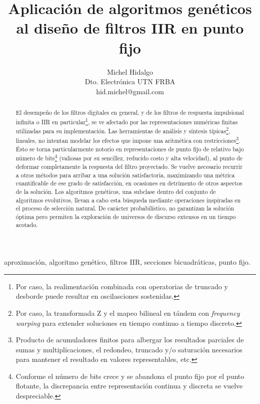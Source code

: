 \documentclass[11pt, journal]{IEEEtran}
\title{Aplicación de algoritmos genéticos al diseño de filtros IIR en punto fijo}
\author{Michel Hidalgo\\Dto. Electrónica UTN FRBA\\hid.michel@gmail.com}
\begin{document}
\maketitle

\begin{abstract}

  El desempeño de los filtros digitales en general, y de los filtros de
  respuesta impulsional infinita o IIR en particular\footnote{Por caso, la realimentación
    combinada con operatorias de truncado y desborde puede resultar en oscilasciones sostenidas.},
  se ve afectado por las representaciones numéricas finitas utilizadas para su implementación.
  Las herramientas de análisis y síntesis típicas\footnote{Por caso, la transformada Z y el
    mapeo bilineal en tándem con \emph{frequency warping} para extender soluciones en tiempo
    continuo a tiempo discreto.}, lineales, no intentan modelar los efectos que impone una
  aritmética con restricciones\footnote{Producto de acumuladores finitos para albergar los
    resultados parciales de sumas y multiplicaciones, el redondeo, truncado y/o saturación
    necesarios para mantener el resultado en valores representables, etc.}. Ésto se torna
  particularmente notorio en representaciones de punto fijo de relativo bajo número de
  bits\footnote{Conforme el número de bits crece y se abandona el punto fijo por el
    punto flotante, la discrepancia entre representación continua y discreta se vuelve
    despreciable.} (valiosas por su sencillez, reducido costo y alta velocidad), al punto de
  deformar completamente la respuesta del filtro proyectado. Se vuelve necesario recurrir a
  otros métodos para arribar a una solución satisfactoria, maximizando una métrica cuantificable
  de ese grado de satisfacción, en ocasiones en detrimento de otros aspectos de la solución.
  Los algoritmos genéticos, una subclase dentro del conjunto de algoritmos evolutivos, llevan a
  cabo esta búsqueda mediante operaciones inspiradas en el proceso de selección natural.
  De carácter probabilístico, no garantizan la solución óptima pero permiten la exploración de
  universos de discurso extensos en un tiempo acotado.
  
\end{abstract}

\def\IEEEkeywordsname{Palabras Clave}

\begin{IEEEkeywords}
  aproximación, algoritmo genético, filtros IIR, secciones bicuadráticas, punto fijo.
\end{IEEEkeywords}
\end{document}
